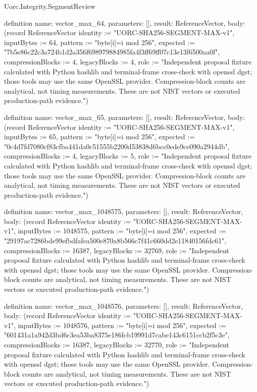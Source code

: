 \begin{lexlean}{Uorc.Integrity.SegmentReview}
\begin{semanticmodule}
definition{
  name: vector_max_64,
  parameters: [],
  result: ReferenceVector,
  body: (record ReferenceVector {identity := "UORC-SHA256-SEGMENT-MAX-v1", inputBytes := 64, pattern := "byte[i]=i mod 256", expected := "7b5e86c22c3a724b1d2a356f698979884985fa4f3ff69ff07c13e13f6500aa0f", compressionBlocks := 4, legacyBlocks := 4, role := "Independent proposal fixture calculated with Python hashlib and terminal-frame cross-check with openssl dgst; those tools may use the same OpenSSL provider. Compression-block counts are analytical, not timing measurements. These are not NIST vectors or executed production-path evidence."})
}

definition{
  name: vector_max_65,
  parameters: [],
  result: ReferenceVector,
  body: (record ReferenceVector {identity := "UORC-SHA256-SEGMENT-MAX-v1", inputBytes := 65, pattern := "byte[i]=i mod 256", expected := "0c4d7fd7080cf83cfba441da0c51555b2200d53838d6bcc0ede9ce090a2944db", compressionBlocks := 4, legacyBlocks := 5, role := "Independent proposal fixture calculated with Python hashlib and terminal-frame cross-check with openssl dgst; those tools may use the same OpenSSL provider. Compression-block counts are analytical, not timing measurements. These are not NIST vectors or executed production-path evidence."})
}

definition{
  name: vector_max_1048575,
  parameters: [],
  result: ReferenceVector,
  body: (record ReferenceVector {identity := "UORC-SHA256-SEGMENT-MAX-v1", inputBytes := 1048575, pattern := "byte[i]=i mod 256", expected := "29197ac7286bde99efbdfafea500e870a8b566c7f41c660dd2e11840156fdc61", compressionBlocks := 16387, legacyBlocks := 32769, role := "Independent proposal fixture calculated with Python hashlib and terminal-frame cross-check with openssl dgst; those tools may use the same OpenSSL provider. Compression-block counts are analytical, not timing measurements. These are not NIST vectors or executed production-path evidence."})
}

definition{
  name: vector_max_1048576,
  parameters: [],
  result: ReferenceVector,
  body: (record ReferenceVector {identity := "UORC-SHA256-SEGMENT-MAX-v1", inputBytes := 1048576, pattern := "byte[i]=i mod 256", expected := "601431a1a942d3bd6c3ea53ba8375e186fcb19991d7cabe143c6151ccb2f5c3e", compressionBlocks := 16387, legacyBlocks := 32770, role := "Independent proposal fixture calculated with Python hashlib and terminal-frame cross-check with openssl dgst; those tools may use the same OpenSSL provider. Compression-block counts are analytical, not timing measurements. These are not NIST vectors or executed production-path evidence."})
}


\end{semanticmodule}
\end{lexlean}
